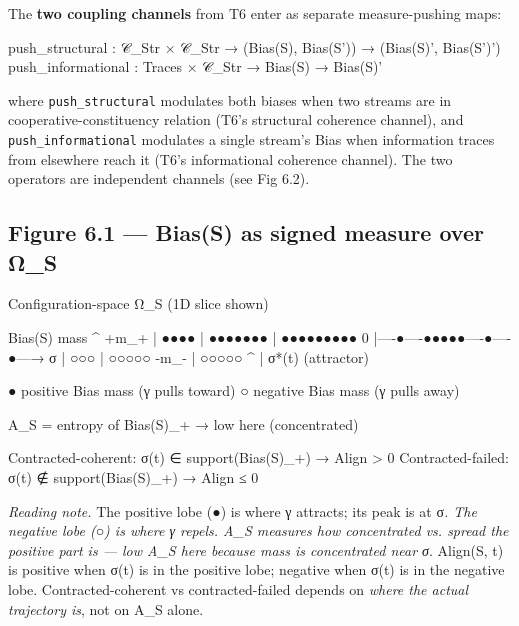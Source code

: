 \documentclass[11pt, openany]{book}
\begin{document}
The \textbf{two coupling channels} from T6 enter as separate measure-pushing maps:

\begin{Code}
push_structural : 𝒞_Str × 𝒞_Str → (Bias(S), Bias(S')) → (Bias(S)', Bias(S')')
push_informational : Traces × 𝒞_Str → Bias(S) → Bias(S)'
\end{Code}

where \texttt{push\_structural} modulates both biases when two streams are in cooperative-constituency relation (T6's structural coherence channel), and \texttt{push\_informational} modulates a single stream's Bias when information traces from elsewhere reach it (T6's informational coherence channel). The two operators are independent channels (see Fig 6.2).

\subsection{Figure 6.1 --- Bias(S) as signed measure over Ω\_\allowbreak{}S}

\begin{Code}
Configuration-space Ω_S (1D slice shown)

Bias(S) mass ^
        +m_+ | ●●●●
             | ●●●●●●●
             | ●●●●●●●●●
           0 |----●----●●●●●----●----●---→ σ
             |             ○○○
             |           ○○○○○
        -m_- |           ○○○○○
                          ^
                          |
                        σ*(t) (attractor)

  ● positive Bias mass (γ pulls toward)
  ○ negative Bias mass (γ pulls away)

  A_S = entropy of Bias(S)_+  → low here (concentrated)

  Contracted-coherent:  σ(t) ∈ support(Bias(S)_+)  → Align > 0
  Contracted-failed:    σ(t) ∉ support(Bias(S)_+)  → Align ≤ 0
\end{Code}

\textit{Reading note.} The positive lobe (●) is where γ attracts; its peak is at σ\textit{. The negative lobe (○) is where γ repels. A\_\allowbreak{}S measures how concentrated vs. spread the positive part is --- low A\_\allowbreak{}S here because mass is concentrated near σ}. Align(S, t) is positive when σ(t) is in the positive lobe; negative when σ(t) is in the negative lobe. Contracted-coherent vs contracted-failed depends on \textit{where the actual trajectory is}, not on A\_\allowbreak{}S alone.
\end{document}
